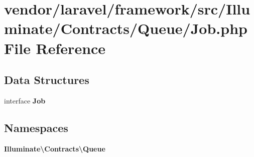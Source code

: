 \section{vendor/laravel/framework/src/\+Illuminate/\+Contracts/\+Queue/\+Job.php File Reference}
\label{_contracts_2_queue_2_job_8php}
\subsection*{Data Structures}
\begin{DoxyCompactItemize}
\item 
interface {\bf Job}
\end{DoxyCompactItemize}
\subsection*{Namespaces}
\begin{DoxyCompactItemize}
\item 
 {\bf Illuminate\textbackslash{}\+Contracts\textbackslash{}\+Queue}
\end{DoxyCompactItemize}
